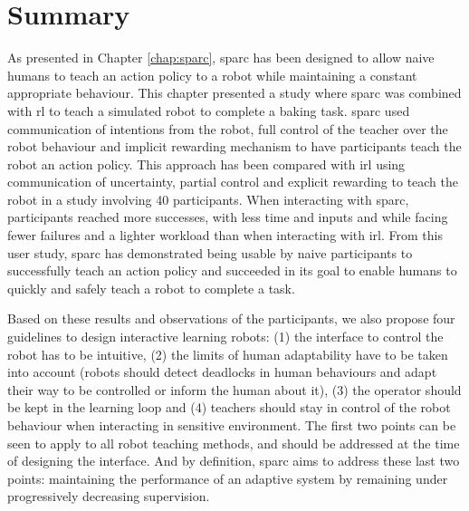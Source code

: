 \section{Summary}

As presented in Chapter \ref{chap:sparc}, \gls{sparc} has been designed to allow naive humans to teach an action policy to a robot while maintaining a constant appropriate behaviour. This chapter presented a study where \gls{sparc} was combined with \gls{rl} to teach a simulated robot to complete a baking task. \gls{sparc} used communication of intentions from the robot, full control of the teacher over the robot behaviour and implicit rewarding mechanism to have participants teach the robot an action policy. This approach has been compared with \gls{irl} using communication of uncertainty, partial control and explicit rewarding to teach the robot in a study involving 40 participants. When interacting with \gls{sparc}, participants reached more successes, with less time and inputs and while facing fewer failures and a lighter workload than when interacting with \gls{irl}. From this user study, \gls{sparc} has demonstrated being usable by naive participants to successfully teach an action policy and succeeded in its goal to enable humans to quickly and safely teach a robot to complete a task.

Based on these results and observations of the participants, we also propose four guidelines to design interactive learning robots: (1) the interface to control the robot has to be intuitive, (2) the limits of human adaptability have to be taken into account (robots should detect deadlocks in human behaviours and adapt their way to be controlled or inform the human about it), (3) the operator should be kept in the learning loop and (4) teachers should stay in control of the robot behaviour when interacting in sensitive environment. The first two points can be seen to apply to all robot teaching methods, and should be addressed at the time of designing the interface. And by definition, \gls{sparc} aims to address these last two points: maintaining the performance of an adaptive system by remaining under progressively decreasing supervision. 


